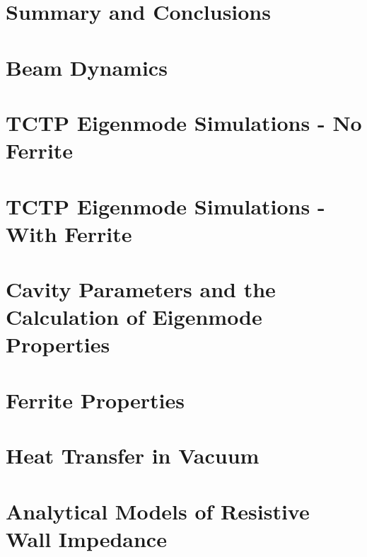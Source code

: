 \documentclass[12pt,PhD]{Thesis}
\begin{document}
\chapter{Summary and Conclusions}






\appendix{}
\chapter{Beam Dynamics}
\label{app:BeamDyn}



\chapter{TCTP Eigenmode Simulations - No Ferrite}
\label{app:tctp-eigenmodes}

\chapter{TCTP Eigenmode Simulations - With Ferrite}

\chapter{Cavity Parameters and the Calculation of Eigenmode Properties}

\chapter{Ferrite Properties}

\chapter{Heat Transfer in Vacuum}

\chapter{Analytical Models of Resistive Wall Impedance}

\end{document}

